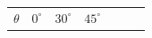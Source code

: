{{    %
    
        \begin{center}
      
      \label{m39414*id86909}
      
    \noindent
      \tablelasttail{}
      \begin{xtabular}[t]{|l|l|l|l|l|l|l|}\hline
    
    
        
                  \begin{math}\theta \end{math}
                 &
    
    
        
                  \begin{math}{0}^{\circ }\end{math}
                 &
    
    
        
                  \begin{math}{30}^{\circ }\end{math}
                 &
    
    
        
                  \begin{math}{45}^{\circ }\end{math}
                 &
    
    

\end{xtabular}
\end{center}}}

